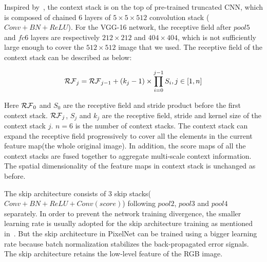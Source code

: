 \documentclass[letterpaper, 10 pt, conference]{ieeeconf}
\begin{document}

Inspired by~\cite{shuai2016improving}, the context stack is on the top of pre-trained truncated CNN, which is composed of chained 6 layers of $5 \times 5 \times 512$ convolution stack ($Conv+BN+ReLU$). For the VGG-16 network, the receptive field after $pool5$ and $fc6$ layers are respectively $212\times212$ and $404\times404$, which is not sufficiently large enough to cover the $512\times512$ image that we used. The receptive field of the context stack can be described as below:

\begin{equation}
{\cal RF}_{j} = {\cal RF}_{j-1} + (k_{j} - 1) \times \prod_{i=0}^{j-1}S_{i}, j \in [1,n] 
\label{eq:receptive field}
\end{equation}

Here ${\cal RF}_{0}$ and $S_{0}$ are the receptive field and stride product before the first context stack. ${\cal RF}_{j}$, $S_{j}$ and $k_{j}$ are the receptive field, stride and kernel size of the context stack $j$. $n = 6$ is the number of context stacks. The context stack can expand the receptive field progressively to cover all the elements in the current feature map(the whole original image). In addition, the score maps of all the context stacks are fused together to aggregate multi-scale context information. The spatial dimensionality of the feature maps in context stack is unchanged as before. 


The skip architecture consists of 3 skip stacks($Conv+BN+ReLU+Conv(score)$) following $pool2$, $pool3$ and $pool4$ separately. In order to prevent the network training divergence, the smaller learning rate is usually adopted for the skip architecture training as mentioned in~\cite{long2015fully}. But the skip architecture in PixelNet can be trained using a bigger learning rate because batch normalization stabilizes the back-propagated error signals. The skip architecture retains the low-level feature of the RGB image. %

\end{document}
